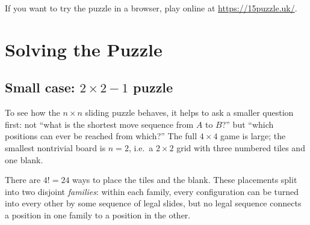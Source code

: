 If you want to try the puzzle in a browser, play online at
\url{https://15puzzle.uk/}.

\section{Solving the Puzzle}
\subsection{Small case: \(2\times 2-1\) puzzle}
To see how the \(n\times n\) sliding puzzle behaves, it helps to ask a smaller
question first: not ``what is the shortest move sequence from \(A\) to \(B\)?''
but ``which positions can ever be reached from which?'' The full \(4\times 4\)
game is large; the smallest nontrivial board is \(n=2\), i.e.\ a \(2\times 2\)
grid with three numbered tiles and one blank.

There are \(4! = 24\) ways to place the tiles and the blank. These placements
split into two disjoint \emph{families}: within each family, every configuration
can be turned into every other by some sequence of legal slides, but no legal
sequence connects a position in one family to a position in the other.

